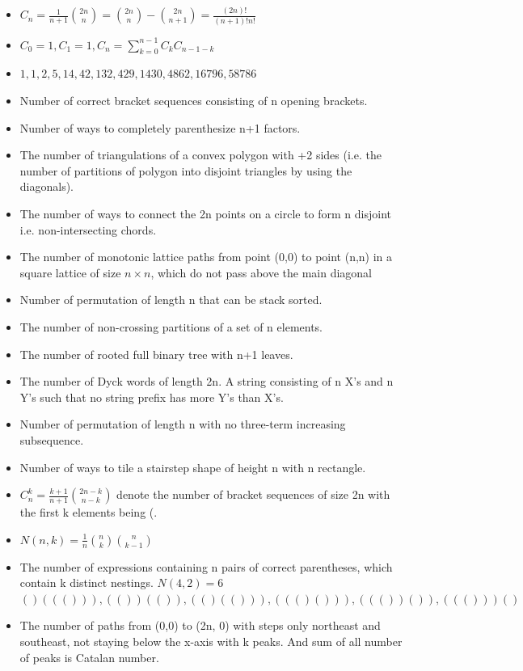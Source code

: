 \begin{itemize}
  \setlength{\itemsep}{0.2ex}
  \setlength{\topsep}{0.3ex}
  \setlength{\parsep}{0pt}
  \setlength{\partopsep}{0pt}
    \item $C_n = \frac{1}{n+1}\binom{2n}{n} = \binom{2n}{n}-\binom{2n}{n+1} = \frac{(2n)!}{(n+1)!n!}$
    \item $C_0 = 1, C_1 = 1, C_n = \sum_{k=0}^{n-1}C_kC_{n-1-k}$
    \item $1, 1, 2, 5, 14, 42, 132, 429, 1430, 4862, 16796, 58786$
    \item Number of correct bracket sequences consisting of n opening brackets.
    \item Number of ways to completely parenthesize n+1 factors.
    \item The number of triangulations of a convex polygon with +2 sides (i.e. the number of partitions of polygon into disjoint triangles by using the diagonals).
    \item The number of ways to connect the 2n points on a circle to form n disjoint i.e. non-intersecting chords.
    \item The number of monotonic lattice paths from point (0,0) to point (n,n) in a square lattice of size $n\times n$, which do not pass above the main diagonal
    \item Number of permutation of length n that can be stack sorted.
    \item The number of non-crossing partitions of a set of n elements.
    \item The number of rooted full binary tree with n+1 leaves.
    \item The number of Dyck words of length 2n. A string consisting of n X's and n Y's such that no string prefix has more Y's than X's.
    \item Number of permutation of length n with no three-term increasing subsequence.
    \item Number of ways to tile a stairstep shape of height n with n rectangle.
    \item $C^k_n = \frac{k+1}{n+1}\binom{2n-k}{n-k}$ denote the number of bracket sequences of size 2n with the first k elements being (.
    \item $N(n,k) = \frac{1}{n}\binom{n}{k}\binom{n}{k-1}$
    \item The number of expressions containing n pairs of correct parentheses, which contain k distinct nestings.
    $N(4,2) = 6$ \\
    $()((())), (())(()), (()(())), ((()())), ((())()), ((()))()$
    \item The number of paths from (0,0) to (2n, 0) with steps only northeast and southeast, not staying below the x-axis with k peaks. And sum of all number of peaks is Catalan number.
\end{itemize}
